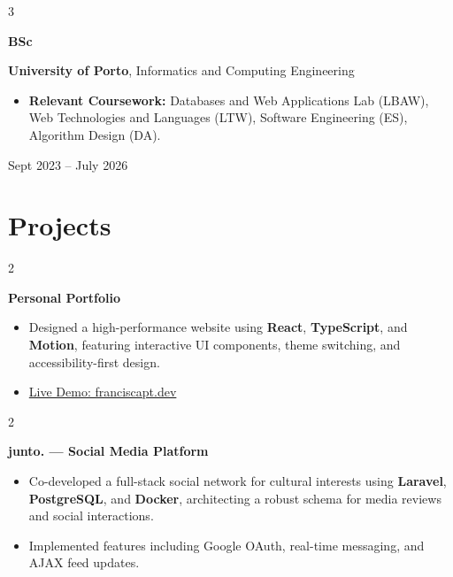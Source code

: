 \documentclass[10pt, letterpaper]{article}
\newenvironment{highlights}{
    \begin{itemize}[
        topsep=0.06 cm, 
        parsep=0.06 cm, 
        partopsep=0pt,
        itemsep=0pt,
        leftmargin=0.3 cm + 8pt 
    ]
}{
    \end{itemize}
}
\newenvironment{twocolentry}[2][]{
    \onecolentry
    \def\secondColumn{#2}
    \setcolumnwidth{\fill, 3.8 cm} 
    \begin{paracol}{2}
}{
    \switchcolumn \raggedleft \secondColumn
    \end{paracol}
    \endonecolentry
}
\newenvironment{threecolentry}[3][]{
    \onecolentry
    \def\thirdColumn{#3}
    \setcolumnwidth{0.8 cm, \fill, 4.2 cm} 
    \begin{paracol}{3}
    {\raggedright #2} \switchcolumn
}{
    \switchcolumn \raggedleft \thirdColumn
    \end{paracol}
    \endonecolentry
}
\let\hrefWithoutArrow\href
\renewcommand{\href}[2]{\hrefWithoutArrow{#1}{\ifthenelse{\equal{#2}{}}{ }{#2 }\raisebox{.15ex}{\footnotesize \faExternalLink*}}}
\begin{document}
        \vspace{0.18 cm}

        \begin{threecolentry}{\textbf{BSc}}{Sept 2023 – July 2026}
            \textbf{University of Porto}, Informatics and Computing Engineering
            \begin{highlights}
                \item \textbf{Relevant Coursework:} Databases and Web Applications Lab (LBAW), Web Technologies and Languages (LTW), Software Engineering (ES), Algorithm Design (DA).
            \end{highlights}
        \end{threecolentry}

   \section{Projects}
    \begin{twocolentry}{\href{https://github.com/franpts2/portfolio}{}}
        \textbf{Personal Portfolio}
        \begin{highlights}
            \item Designed a high-performance website using \textbf{React}, \textbf{TypeScript}, and \textbf{Motion}, featuring interactive UI components, theme switching, and accessibility-first design.
            \item \hrefWithoutArrow{https://franciscapt.dev}{Live Demo: franciscapt.dev}
        \end{highlights}
    \end{twocolentry}

    \vspace{0.15 cm}

     \begin{twocolentry}{\href{https://github.com/franpts2/junto}{}}
        \textbf{junto. — Social Media Platform}
        \begin{highlights}
            \item Co-developed a full-stack social network for cultural interests using \textbf{Laravel}, \textbf{PostgreSQL}, and \textbf{Docker}, architecting a robust schema for media reviews and social interactions.
            \item Implemented features including Google OAuth, real-time messaging, and AJAX feed updates.
        \end{highlights}
    \end{twocolentry}
\end{document}
